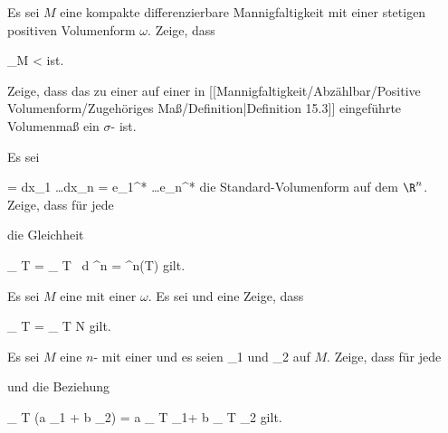 \setcounter{section}{15}


{}
{

Es sei $M$ eine kompakte differenzierbare Mannigfaltigkeit mit einer stetigen positiven Volumenform $\omega$. Zeige, dass

\mavergleichskettedisp
{\vergleichskette
{ \int_M \omega
}
{ <} { \infty
}
{ } {
}
{ } {
}
{ } {
}
}
{}{}{}
ist.

}
{} {}

{}
{

Zeige, dass das zu einer
auf einer
in
[[Mannigfaltigkeit/Abzählbar/Positive Volumenform/Zugehöriges Maß/Definition|Definition 15.3]]
eingeführte Volumenmaß ein
$\sigma$-
ist.

}
{} {}

{}
{

Es sei

\mavergleichskettedisp
{\vergleichskette
{ \omega
}
{ =} { dx_1 \wedge \ldots \wedge dx_n
}
{ =} { e_1^* \wedge \ldots \wedge e_n^*
}
{ } {
}
{ } {
}
}
{}{}{}
die Standard-Volumenform auf dem $\R^n$. Zeige, dass für jede

 die Gleichheit

\mavergleichskettedisp
{\vergleichskette
{
\int_{ T  }   \omega
}
{ =} { \int_{  T  }     \,  d  \lambda^n
}
{ =} { \lambda^n(T)
}
{ } {
}
{ } {
}
}
{}{}{}
gilt.

}
{} {}

{}
{

Es sei $M$ eine
mit einer
$\omega$. Es sei
und
 eine
Zeige, dass

\mavergleichskettedisp
{\vergleichskette
{
\int_{ T  }   \omega
}
{ =} {
\int_{ T \setminus N  }   \omega
}
{ } {
}
{ } {
}
{ } {
}
}
{}{}{}
gilt.

}
{} {}

{}
{

Es sei $M$ eine
$n$-
mit einer
und es seien
\mathkor {} {\omega_1} {und} {\omega_2} {}
auf $M$. Zeige, dass für jede

 und
 die Beziehung

\mavergleichskettedisp
{\vergleichskette
{
\int_{ T  }  (a \omega_1 + b \omega_2)
}
{ =} { a
\int_{  T  }   \omega_1+ b
\int_{  T  }   \omega_2
}
{ } {
}
{ } {
}
{ } {
}
}
{}{}{}
gilt.

}
{} {}

